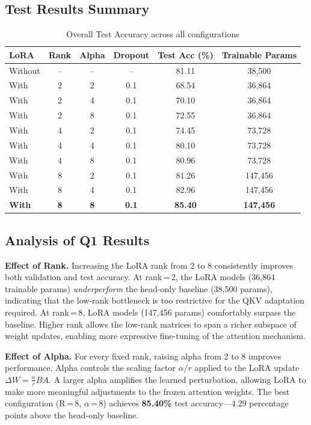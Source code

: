 \documentclass[12pt,a4paper]{article}
\begin{document}
\subsection{Test Results Summary}

\begin{table}[H]
\centering
\caption{Overall Test Accuracy across all configurations}
\begin{tabular}{lccccc}
\toprule
LoRA & Rank & Alpha & Dropout & Test Acc (\%) & Trainable Params \\
\midrule
Without & -- & -- & -- & 81.11 & 38,500 \\
With & 2 & 2 & 0.1 & 68.54 & 36,864 \\
With & 2 & 4 & 0.1 & 70.10 & 36,864 \\
With & 2 & 8 & 0.1 & 72.55 & 36,864 \\
With & 4 & 2 & 0.1 & 74.45 & 73,728 \\
With & 4 & 4 & 0.1 & 80.10 & 73,728 \\
With & 4 & 8 & 0.1 & 80.96 & 73,728 \\
With & 8 & 2 & 0.1 & 81.26 & 147,456 \\
With & 8 & 4 & 0.1 & 82.96 & 147,456 \\
\textbf{With} & \textbf{8} & \textbf{8} & \textbf{0.1} & \textbf{85.40} & \textbf{147,456} \\
\bottomrule
\end{tabular}
\end{table}

\subsection{Analysis of Q1 Results}

\textbf{Effect of Rank.}
Increasing the LoRA rank from 2 to 8 consistently improves both validation and test accuracy.
At rank\,=\,2, the LoRA models (36,864 trainable params) \emph{underperform} the head-only baseline (38,500 params), indicating that the low-rank bottleneck is too restrictive for the QKV adaptation required.
At rank\,=\,8, LoRA models (147,456 params) comfortably surpass the baseline.
Higher rank allows the low-rank matrices to span a richer subspace of weight updates, enabling more expressive fine-tuning of the attention mechanism.

\textbf{Effect of Alpha.}
For every fixed rank, raising alpha from 2 to 8 improves performance.
Alpha controls the scaling factor $\alpha / r$ applied to the LoRA update $\Delta W = \frac{\alpha}{r} B A$.
A larger alpha amplifies the learned perturbation, allowing LoRA to make more meaningful adjustments to the frozen attention weights.
The best configuration (R\,=\,8, $\alpha$\,=\,8) achieves \textbf{85.40\%} test accuracy---4.29 percentage points above the head-only baseline.
\end{document}
